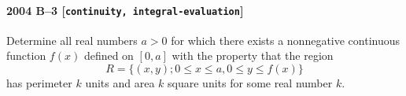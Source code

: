 \paragraph{2004 B--3 \textnormal{[\texttt{continuity, integral-evaluation}]}}
Determine all real numbers $a > 0$ for which there exists a nonnegative
continuous function $f(x)$ defined on $[0,a]$ with the property that the
region
\[
R = \{ (x,y) ; 0 \le x \le a, 0 \le y \le f(x) \}
\]
has perimeter $k$ units and area $k$ square units for some real number $k$.
